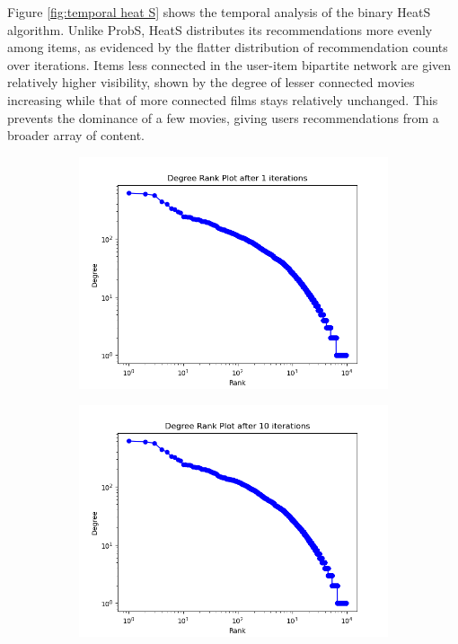 \documentclass[12pt]{article}
\numberwithin{equation}{section}
\begin{document}
Figure \ref{fig:temporal heat S} shows the temporal analysis of the binary HeatS algorithm. Unlike ProbS, HeatS distributes its recommendations more evenly among items, as evidenced by the flatter distribution of recommendation counts over iterations. Items less connected in the user-item bipartite network are given relatively higher visibility, shown by the degree of lesser connected movies increasing while that of more connected films stays relatively unchanged. This prevents the dominance of a few movies, giving users recommendations from a broader array of content.

\begin{figure}[!ht]
\centering

\begin{subfigure}[b]{0.32\textwidth}
    \includegraphics[width=\textwidth]{Heat S movie rank plot - 1 iterations.png}
\end{subfigure}
\hfill
\begin{subfigure}[b]{0.32\textwidth}
    \includegraphics[width=\textwidth]{Heat S movie rank plot - 10 iterations.png}

\end{subfigure}
\end{figure}
\end{document}
